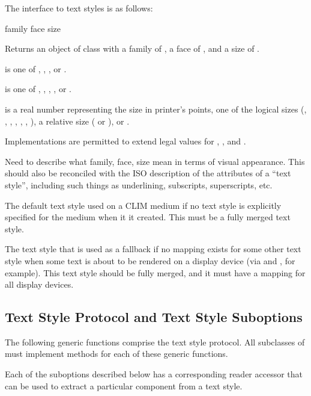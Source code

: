 The interface to text styles is as follows:

 {family face size}

Returns an object of class  with a family of
, a face of , and a size of .

 is one of , , , or .

 is one of , , , ,
or .

 is a real number representing the size in printer's points, one of
the logical sizes (, , , ,
, , ), a relative size ( or
), or .

Implementations are permitted to extend legal values for ,
, and .

 {Need to describe what family, face, size mean in terms of
visual appearance.  This should also be reconciled with the ISO description of
the attributes of a ``text style'', including such things as underlining,
subscripts, superscripts, etc.}


The default text style used on a CLIM medium if no text style is explicitly
specified for the medium when it it created.  This must be a fully merged text
style.


The text style that is used as a fallback if no mapping exists for some other
text style when some text is about to be rendered on a display device (via
 and , for example).  This text style should be fully
merged, and it must have a mapping for all display devices.


\subsection {Text Style Protocol and Text Style Suboptions}

The following generic functions comprise the text style protocol.  All
subclasses of  must implement methods for each of these generic
functions.

Each of the suboptions described below has a corresponding reader accessor that
can be used to extract a particular component from a text style.

